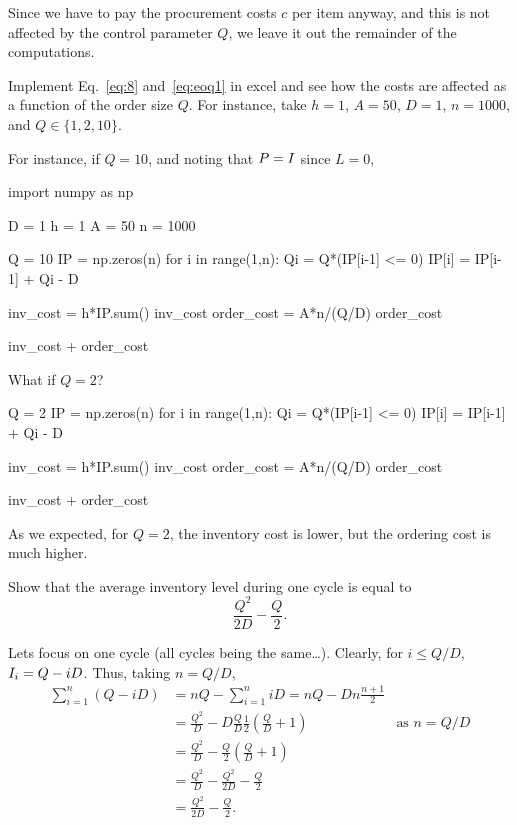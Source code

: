 Since we have to pay the procurement costs $c$ per item anyway, and this is not affected by the control parameter $Q$, we leave it out the remainder of the computations.

\begin{exercise}
  Implement Eq.~\eqref{eq:8} and~\eqref{eq:eoq1} in excel and see how the costs are affected as a function of the order size $Q$. For instance, take $h=1$, $A=50$, $D=1$, $n=1000$, and $Q\in\{1, 2, 10\}$.
  \begin{solution}
For instance, if $Q=10$, and noting that $P=I$ since $L=0$, 
\begin{pyconsole}[eoq]
import numpy as np

D = 1
h = 1
A = 50
n = 1000

Q = 10      
IP = np.zeros(n)
for i in range(1,n):
   Qi = Q*(IP[i-1] <= 0)
   IP[i] = IP[i-1] + Qi - D

inv_cost = h*IP.sum()
inv_cost
order_cost = A*n/(Q/D)
order_cost

inv_cost + order_cost
\end{pyconsole}

What if $Q=2$?
\begin{pyconsole}[eoq]
Q = 2
IP = np.zeros(n)
for i in range(1,n):
   Qi = Q*(IP[i-1] <= 0)
   IP[i] = IP[i-1] + Qi - D

inv_cost = h*IP.sum()
inv_cost
order_cost = A*n/(Q/D)
order_cost

inv_cost + order_cost
\end{pyconsole}

As we expected, for $Q=2$, the inventory cost is  lower, but the ordering cost is much higher. 
  \end{solution}
\end{exercise}

\begin{exercise}
  Show that the average inventory level during one cycle is equal to 
  \begin{equation*}
    \frac{Q^2}{2D} - \frac{Q}2.
  \end{equation*}
  \begin{solution}
Lets focus on one cycle (all cycles being the same\ldots). Clearly, for $i\leq Q/D$, 
 $I_i = Q-iD$. Thus, taking $n=Q/D$, 
 \begin{align*}
   \sum_{i=1}^n (Q-iD) 
&= n Q - \sum_{i=1}^n i D = n Q - D n \frac{n+1}2 \\
&= \frac{Q^2} D - D \frac Q D \frac 1 2 \left(\frac Q D + 1\right) & \text{as } n = Q/D \\
&= \frac{Q^2} D - \frac Q 2 \left(\frac Q D + 1\right)\\
&= \frac{Q^2} D - \frac{Q^2}{2D} - \frac Q 2\\
&= \frac{Q^2}{2D}- \frac Q 2.
 \end{align*}
  \end{solution}
\end{exercise}

